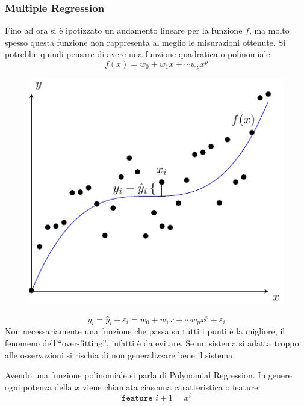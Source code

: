 \documentclass{article}
\numberwithin{equation}{subsection}
\begin{document}
\subsubsection{Multiple Regression}

Fino ad ora si è ipotizzato un andamento lineare per la funzione $f$, ma molto spesso questa 
funzione non rappresenta al meglio le misurazioni ottenute. 
Si potrebbe quindi pensare di avere una funzione quadratica o polinomiale:
\begin{equation*}
    f(x)=w_0+w_1x+\cdots w_px^p
\end{equation*}

\begin{figure}[H]%
    \centering%
    \includegraphics[scale=0.75]{regressione_polinomiale.pdf}%
\end{figure}

\begin{equation}
    y_i=\hat{y}_i+\varepsilon_i=w_0+w_1x+\cdots w_px^p+\varepsilon_i
\end{equation}
Non necessariamente una funzione che passa su tutti i punti è la migliore, il fenomeno 
dell'``over-fitting'', infatti è da evitare. Se un sistema si adatta troppo alle osservazioni si rischia di non generalizzare bene il sistema. 

Avendo una funzione polinomiale si parla di Polynomial Regression. In genere ogni 
potenza della $x$ viene chiamata ciascuna caratteristica o feature:
\begin{equation*}
    \texttt{feature } i+1=x^{i}
\end{equation*}
\end{document}
